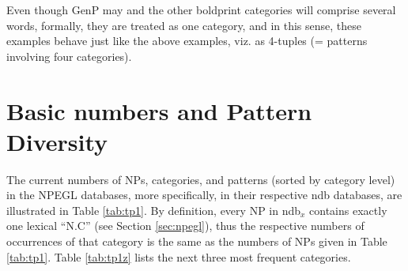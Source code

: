 \documentclass[output=paper,colorlinks,citecolor=brown,draft]{langscibook}
\begin{document}
Even though GenP may and the other boldprint categories  will comprise several words, formally, they are treated as one category, and in this sense, these examples behave just like the above examples, viz. as 4-tuples (= patterns involving four categories). 


\section{Basic numbers and Pattern Diversity}
\label{sec:PatDiv}


The current numbers of NPs, categories, and patterns (sorted by category level) in the NPEGL databases, more specifically, in their respective ndb databases, are illustrated in Table \ref{tab:tp1}.  
By definition, every NP in ndb$_x$ contains exactly one lexical  ``N.C'' (see Section \ref{sec:npegl}),  thus the respective numbers of occurrences of that category is the same as the numbers of NPs given in Table \ref{tab:tp1}. Table \ref{tab:tp1z}  lists  the next three most frequent categories.  
\end{document}
